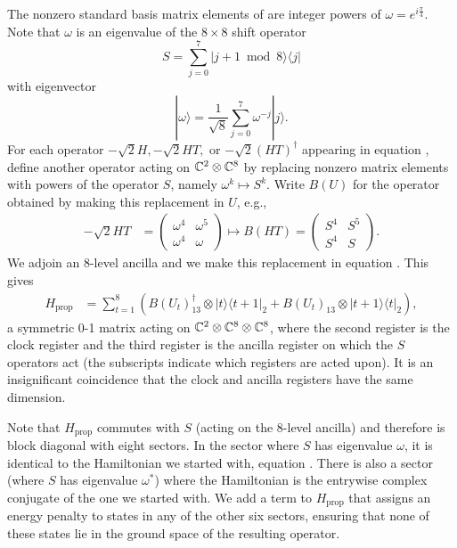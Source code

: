 \documentclass[../thesis-main/thesis-main]{subfiles}
\begin{document}
The nonzero standard basis matrix elements of  are integer powers of $\omega=e^{i\frac{\pi}{4}}$. Note that $\omega$ is an eigenvalue of the $8\times8$ shift operator 
\[
S=\sum_{j=0}^{7}|j+1\bmod 8\rangle\langle j|
\]
with eigenvector 
\[
|\omega\rangle=\frac{1}{\sqrt{8}}\sum_{j=0}^{7}\omega^{-j}|j\rangle.
\]
For each operator $-\sqrt{2}H,-\sqrt{2}HT,$ or $-\sqrt{2}(HT)^{\dagger}$ appearing in equation , define another operator acting on $\mathbb{C}^{2}\otimes\mathbb{C}^{8}$ by replacing nonzero matrix elements with powers of the operator $S$, namely $\omega^k \mapsto S^k$. Write $B(U)$ for the operator obtained by making this replacement in $U$, e.g.,
\begin{align*}
-\sqrt{2}HT & = \begin{pmatrix}
\omega^{4} & \omega^{5}\\
\omega^{4} & \omega
\end{pmatrix} 
\mapsto B(HT)
=\begin{pmatrix}
S^{4} & S^{5}\\
S^{4} & S
\end{pmatrix}.
\end{align*}
We adjoin an 8-level ancilla and we make this replacement in equation . This gives
\begin{align}
H_{\text{prop}} & =\sum_{t=1}^{8}\left(B(U_{t})^{\dagger}_{13}\otimes|t\rangle\langle t+1|_2+B(U_{t})_{13}\otimes|t+1\rangle\langle t|_2\right),\label{eq:Hprop}
\end{align}
a symmetric $0$-1 matrix acting on $\mathbb{C}^{2}\otimes\mathbb{C}^{8}\otimes\mathbb{C}^{8}$, where the second register is the clock register and the third register is the ancilla register on which the $S$ operators act (the subscripts indicate which registers are acted upon). It is an insignificant coincidence that the clock and ancilla registers have the same dimension. 

Note that $H_{\text{prop}}$ commutes with $S$ (acting on the $8$-level ancilla) and therefore is block diagonal with eight sectors. In the sector where $S$ has eigenvalue $\omega$, it is identical to the Hamiltonian we started with, equation . There is also a sector (where $S$ has eigenvalue $\omega^*$) where the Hamiltonian is the entrywise complex conjugate of the one we started with. We add a term to $H_{\text{prop}}$ that assigns an energy penalty to states in any of the other six sectors, ensuring that none of these states lie in the ground space of the resulting operator.
\end{document}
